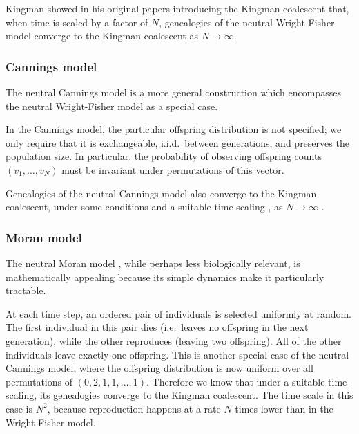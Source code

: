 Kingman showed in his original papers introducing the Kingman coalescent \parencite{kingman1982gene} that, when time is scaled by a factor of $N$, genealogies of the neutral Wright-Fisher model converge to the Kingman coalescent as $N\to\infty$.

\subsubsection{Cannings model}
The neutral Cannings model \parencite{cannings1974, cannings1975} is a more general construction which encompasses the neutral Wright-Fisher model as a special case.

In the Cannings model, the particular offspring distribution is not specified; we only require that it is exchangeable, i.i.d.\ between generations, and preserves the population size. In particular, the probability of observing offspring counts $(v_1, \dots, v_N)$ must be invariant under permutations of this vector.

Genealogies of the neutral Cannings model also converge to the Kingman coalescent, under some conditions and a suitable time-scaling , as $N\to\infty$ \parencite[see for example][Section 2.2]{etheridge2011}. 

\subsubsection{Moran model}
The neutral Moran model \parencite{moran1958}, while perhaps less biologically relevant, is mathematically appealing because its simple dynamics make it particularly tractable.

At each time step, an ordered pair of individuals is selected uniformly at random. The first individual in this pair dies (i.e.\ leaves no offspring in the next generation), while the other reproduces (leaving two offspring). All of the other individuals leave exactly one offspring.
This is another special case of the neutral Cannings model, where the offspring distribution is now uniform over all permutations of $(0,2,1,1,\dots,1)$.
Therefore we know that under a suitable time-scaling, its genealogies converge to the Kingman coalescent. The time scale in this case is $N^2$, because reproduction happens at a rate $N$ times  lower than in the Wright-Fisher model. 



